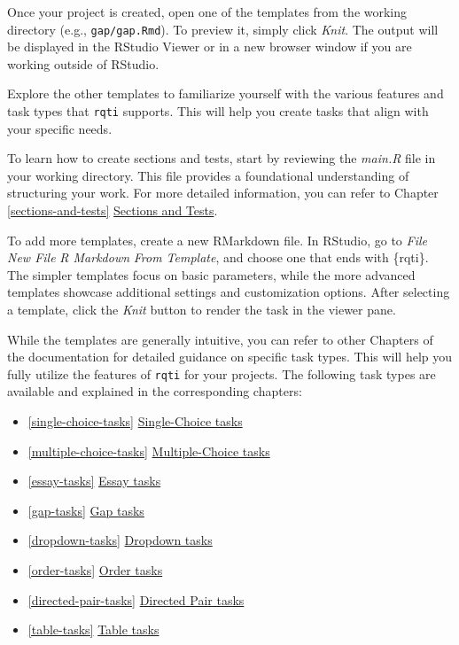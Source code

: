 \documentclass[twoside]{tufte-book}
\providecommand{\tightlist}{%
  \setlength{\itemsep}{0pt}\setlength{\parskip}{0pt}}
\begin{document}
Once your project is created, open one of the templates from the working directory (e.g., \texttt{gap/gap.Rmd}). To preview it, simply click \emph{Knit}. The output will be displayed in the RStudio Viewer or in a new browser window if you are working outside of RStudio.

Explore the other templates to familiarize yourself with the various features and task types that \texttt{rqti} supports. This will help you create tasks that align with your specific needs.

To learn how to create sections and tests, start by reviewing the \emph{main.R} file in your working directory. This file provides a foundational understanding of structuring your work. For more detailed information, you can refer to Chapter \ref{sections-and-tests} \href{Chapters/section.html}{Sections and Tests}.

To add more templates, create a new RMarkdown file. In RStudio, go to \emph{File} \textrightarrow{} \emph{New File} \textrightarrow{} \emph{R Markdown} \textrightarrow{} \emph{From Template}, and choose one that ends with \{rqti\}. The simpler templates focus on basic parameters, while the more advanced templates showcase additional settings and customization options. After selecting a template, click the \emph{Knit} button to render the task in the viewer pane.

While the templates are generally intuitive, you can refer to other Chapters of the documentation for detailed guidance on specific task types. This will help you fully utilize the features of \texttt{rqti} for your projects. The following task types are available and explained in the corresponding chapters:

\begin{itemize}
\tightlist
\item
  \ref{single-choice-tasks} \href{Chapters/singlechoice.html}{Single-Choice tasks}
\item
  \ref{multiple-choice-tasks} \href{Chapters/multiplechoice.html}{Multiple-Choice tasks}
\item
  \ref{essay-tasks} \href{Chapters/essay.html}{Essay tasks}
\item
  \ref{gap-tasks} \href{Chapters/gap.html}{Gap tasks}
\item
  \ref{dropdown-tasks} \href{Chapters/dropdown.html}{Dropdown tasks}
\item
  \ref{order-tasks} \href{Chapters/order.html}{Order tasks}
\item
  \ref{directed-pair-tasks} \href{Chapters/directedpairs.html}{Directed Pair tasks}
\item
  \ref{table-tasks} \href{Chapters/table.html}{Table tasks}
\end{itemize}
\end{document}
